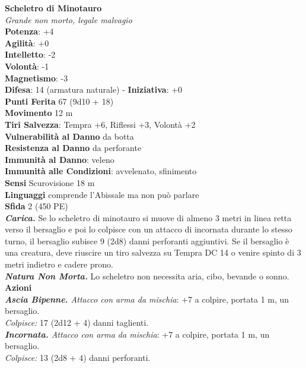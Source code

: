 \begin{multicols}{2}
\medskip\textbf{Scheletro di Minotauro}\\
\emph{Grande non morto, legale malvagio}\\
\textbf{Potenza}: +4\\
\textbf{Agilità}: +0\\
\textbf{Intelletto}: -2\\
\textbf{Volontà}: -1\\
\textbf{Magnetismo}: -3\\
\textbf{Difesa}: 14 (armatura naturale) - \textbf{Iniziativa}: +0\\
\textbf{Punti Ferita} 67 (9d10 + 18)\\
\textbf{Movimento} 12 m\\
\textbf{Tiri Salvezza}: Tempra +6, Riflessi +3, Volontà +2\\
\textbf{Vulnerabilità al Danno} da botta\\
\textbf{Resistenza al Danno} da perforante\\
\textbf{Immunità al Danno}: veleno\\
\textbf{Immunità alle Condizioni}: avvelenato, sfinimento\\
\textbf{Sensi} Scurovisione 18 m\\
\textbf{Linguaggi} comprende l'Abissale ma non può parlare\\
\textbf{Sfida} 2 (450 PE)\smallskip\\
\emph{\textbf{Carica.}} Se lo scheletro di minotauro si muove di almeno 3 metri in linea retta verso il bersaglio e poi lo colpisce con un attacco di incornata durante lo stesso turno, il bersaglio subisce 9 (2d8) danni perforanti aggiuntivi. Se il bersaglio è una creatura, deve riuscire un tiro salvezza su Tempra DC 14 o venire spinto di 3 metri indietro e cadere prono.\\
\emph{\textbf{Natura Non Morta.}} Lo scheletro non necessita aria, cibo, bevande o sonno.\\
\smallskip\textbf{Azioni}\\
\emph{\textbf{Ascia Bipenne.} Attacco con arma da mischia}: +7 a colpire, portata 1 m, un bersaglio.\\
\emph{Colpisce:} 17 (2d12 + 4) danni taglienti.\\
\emph{\textbf{Incornata.} Attacco con arma da mischia}: +7 a colpire, portata 1 m, un bersaglio.\\
\emph{Colpisce:} 13 (2d8 + 4) danni perforanti.\\


\end{multicols}
